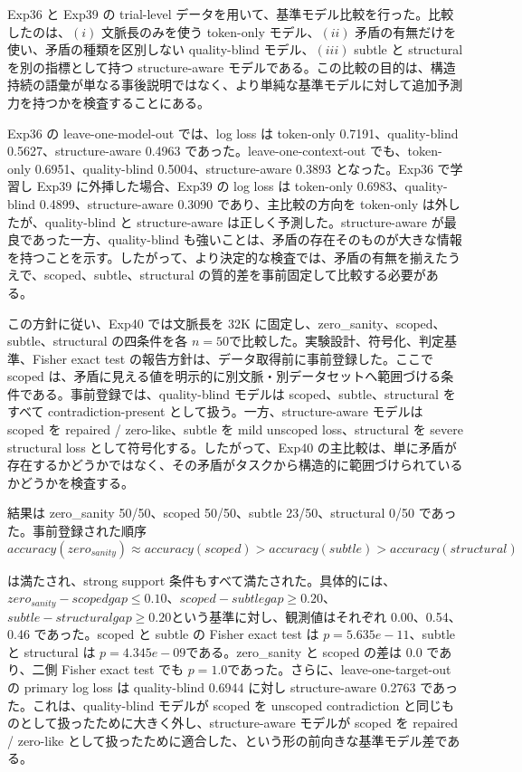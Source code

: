 \documentclass[12pt,a4paper]{article}
\begin{document}
Exp36 と Exp39 の trial-level データを用いて、基準モデル比較を行った。比較したのは、\((i)\) 文脈長のみを使う token-only モデル、\((ii)\) 矛盾の有無だけを使い、矛盾の種類を区別しない quality-blind モデル、\((iii)\) subtle と structural を別の指標として持つ structure-aware モデルである。この比較の目的は、構造持続の語彙が単なる事後説明ではなく、より単純な基準モデルに対して追加予測力を持つかを検査することにある。

Exp36 の leave-one-model-out では、log loss は token-only 0.7191、quality-blind 0.5627、structure-aware 0.4963 であった。leave-one-context-out でも、token-only 0.6951、quality-blind 0.5004、structure-aware 0.3893 となった。Exp36 で学習し Exp39 に外挿した場合、Exp39 の log loss は token-only 0.6983、quality-blind 0.4899、structure-aware 0.3090 であり、主比較の方向を token-only は外したが、quality-blind と structure-aware は正しく予測した。structure-aware が最良であった一方、quality-blind も強いことは、矛盾の存在そのものが大きな情報を持つことを示す。したがって、より決定的な検査では、矛盾の有無を揃えたうえで、scoped、subtle、structural の質的差を事前固定して比較する必要がある。

この方針に従い、Exp40 では文脈長を 32K に固定し、zero\_sanity、scoped、subtle、structural の四条件を各 \(n=50\)で比較した。実験設計、符号化、判定基準、Fisher exact test の報告方針は、データ取得前に事前登録した。ここで scoped は、矛盾に見える値を明示的に別文脈・別データセットへ範囲づける条件である。事前登録では、quality-blind モデルは scoped、subtle、structural をすべて contradiction-present として扱う。一方、structure-aware モデルは scoped を repaired / zero-like、subtle を mild unscoped loss、structural を severe structural loss として符号化する。したがって、Exp40 の主比較は、単に矛盾が存在するかどうかではなく、その矛盾がタスクから構造的に範囲づけられているかどうかを検査する。

結果は zero\_sanity 50/50、scoped 50/50、subtle 23/50、structural 0/50 であった。事前登録された順序 \[
accuracy(zero_{sanity}) ≈ accuracy(scoped) > accuracy(subtle) > accuracy(structural)
\]

は満たされ、strong support 条件もすべて満たされた。具体的には、\(zero_{sanity}-scoped gap \le 0.10\)、\(scoped-subtle gap \ge 0.20\)、\(subtle-structural gap \ge 0.20\)という基準に対し、観測値はそれぞれ 0.00、0.54、0.46 であった。scoped と subtle の Fisher exact test は \(p = 5.635e-11\)、subtle と structural は \(p = 4.345e-09\)である。zero\_sanity と scoped の差は 0.0 であり、二側 Fisher exact test でも \(p = 1.0\)であった。さらに、leave-one-target-out の primary log loss は quality-blind 0.6944 に対し structure-aware 0.2763 であった。これは、quality-blind モデルが scoped を unscoped contradiction と同じものとして扱ったために大きく外し、structure-aware モデルが scoped を repaired / zero-like として扱ったために適合した、という形の前向きな基準モデル差である。
\end{document}

